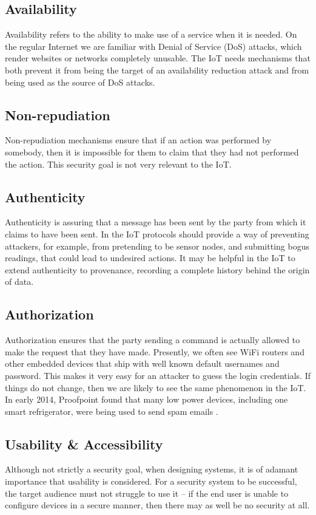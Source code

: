 \documentclass[10pt,journal,compsoc]{IEEEtran}
\begin{document}
\subsection{Availability}
Availability refers to the ability to make use of a service when it is needed.
On the regular Internet we are familiar with Denial of Service (DoS) attacks,
which render websites or networks completely unusable. The IoT needs mechanisms
that both prevent it from being the target of an availability reduction attack
and from being used as the source of DoS attacks.

\subsection{Non-repudiation}
Non-repudiation mechanisms ensure that if an action was performed by somebody,
then it is impossible for them to claim that they had not performed the action.
This security goal is not very relevant to the IoT. 

\subsection{Authenticity}
Authenticity is assuring that a message has been sent by the party from which
it claims to have been sent. In the IoT protocols should provide a way of
preventing attackers, for example, from pretending to be sensor nodes, and
submitting bogus readings, that could lead to undesired actions. It may be
helpful in the IoT to extend authenticity to provenance, recording a complete
history behind the origin of data.  

\subsection{Authorization}
Authorization ensures that the party sending a command is actually allowed
to make the request that they have made. Presently, we often see WiFi routers
and other embedded devices that ship with well known default usernames
and password. This makes it very easy for an attacker to guess the login
credentials. If things do not change, then we are likely to see the same
phenomenon in the IoT. In early 2014, Proofpoint found that many low power
devices, including one smart refrigerator, were being used to send spam emails
\cite{Proofpoint2014}.

\subsection{Usability \& Accessibility}
Although not strictly a security goal, when designing systems, it is of
adamant importance that usability is considered. For a security system to be
successful, the target audience must not struggle to use it -- if the end
user is unable to configure devices in a secure manner, then there may as well
be no security at all. 
\end{document}
